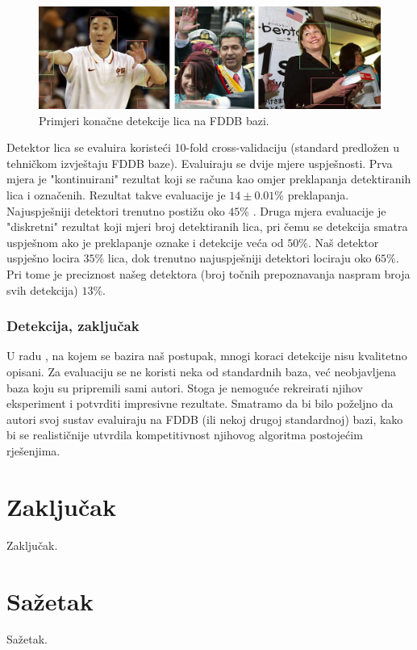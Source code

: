 \documentclass[times, utf8, seminar, numeric]{fer}
\begin{document}
\begin{figure}[!htb]
\centering
\includegraphics[width=\textwidth]{raw/fddb_bboxes.jpg}
\caption{Primjeri konačne detekcije lica na FDDB bazi.}
\label{fig:fddb_bboxes}
\end{figure}

Detektor lica se evaluira koristeći 10-fold cross-validaciju (standard predložen
u tehničkom izvještaju FDDB baze). Evaluiraju se dvije mjere uspješnosti. Prva mjera
je "kontinuirani" rezultat koji se računa kao omjer preklapanja detektiranih lica
i označenih. Rezultat takve evaluacije je $14 \pm 0.01\%$ preklapanja. Najuspješniji
detektori trenutno postižu oko $45\%$ \cite{fddbTech}. Druga mjera evaluacije je "diskretni" rezultat
koji mjeri broj detektiranih lica, pri čemu se detekcija smatra uspješnom ako je preklapanje
oznake i detekcije veća od $50\%$. Naš detektor uspješno locira $35\%$ lica, dok trenutno
najuspješniji detektori lociraju oko $65\%$. Pri tome je preciznost našeg detektora
(broj točnih prepoznavanja naspram broja svih detekcija) $13\%$.

\subsection{Detekcija, zaključak}

U radu \cite{conf/isda/ChandrappaR12}, na kojem se bazira naš postupak, mnogi koraci detekcije nisu kvalitetno
opisani. Za evaluaciju se ne koristi neka od standardnih baza,
već neobjavljena baza koju su pripremili sami autori. Stoga je nemoguće
rekreirati njihov eksperiment i potvrditi impresivne rezultate. Smatramo da bi bilo poželjno
da autori svoj sustav evaluiraju na FDDB (ili nekoj drugoj standardnoj) bazi, kako bi se realističnije
utvrdila kompetitivnost njihovog algoritma postojećim rješenjima.

\chapter{Zaključak}
Zaključak.




\chapter{Sažetak}
Sažetak.
\end{document}
